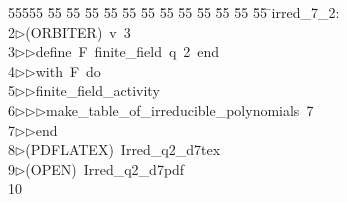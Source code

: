%
%
\begin{tabbing}
55555 \= 55 \= 55 \= 55 \= 55 \= 55 \= 55 \= 55 \= 55 \= 55 \= 55 \= 55 \= 55 \= \>irred\_7\_2:\\[0pt]
2\>$\triangleright$\>(ORBITER)\ v\ 3\ \\[0pt]
3\>$\triangleright$\>$\triangleright$\>define\ F\ finite\_field\ q\ 2\ end\ \\[0pt]
4\>$\triangleright$\>$\triangleright$\>with\ F\ do\ \\[0pt]
5\>$\triangleright$\>$\triangleright$\>finite\_field\_activity\ \\[0pt]
6\>$\triangleright$\>$\triangleright$\>$\triangleright$\>make\_table\_of\_irreducible\_polynomials\ 7\ \\[0pt]
7\>$\triangleright$\>$\triangleright$\>end\\[0pt]
8\>$\triangleright$\>(PDFLATEX)\ Irred\_q2\_d7tex\\[0pt]
9\>$\triangleright$\>(OPEN)\ Irred\_q2\_d7pdf\\[0pt]
10\>\end{tabbing}
